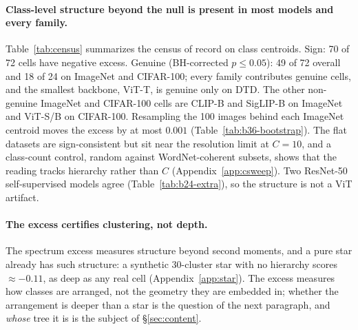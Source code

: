 \paragraph{Class-level structure beyond the null is present in most models and every family.} Table~\ref{tab:census} summarizes the census of record on class centroids. Sign: 70 of 72 cells have negative excess. Genuine (BH-corrected $p\le0.05$): 49 of 72 overall and 18 of 24 on ImageNet and CIFAR-100; every family contributes genuine cells, and the smallest backbone, ViT-T, is genuine only on DTD. The other non-genuine ImageNet and CIFAR-100 cells are CLIP-B and SigLIP-B on ImageNet and ViT-S/B on CIFAR-100. Resampling the 100 images behind each ImageNet centroid moves the excess by at most $0.001$ (Table~\ref{tab:b36-bootstrap}). The flat datasets are sign-consistent but sit near the resolution limit at $C{=}10$, and a class-count control, random against WordNet-coherent subsets, shows that the reading tracks hierarchy rather than $C$ (Appendix~\ref{app:csweep}). Two ResNet-50 self-supervised models agree (Table~\ref{tab:b24-extra}), so the structure is not a ViT artifact. %

\paragraph{The excess certifies clustering, not depth.} The spectrum excess measures structure beyond second moments, and a pure star already has such structure: a synthetic 30-cluster star with no hierarchy scores $\approx-0.11$, as deep as any real cell (Appendix~\ref{app:star}). The excess measures how classes are arranged, not the geometry they are embedded in; whether the arrangement is deeper than a star is the question of the next paragraph, and \emph{whose} tree it is is the subject of \S\ref{sec:content}. %

